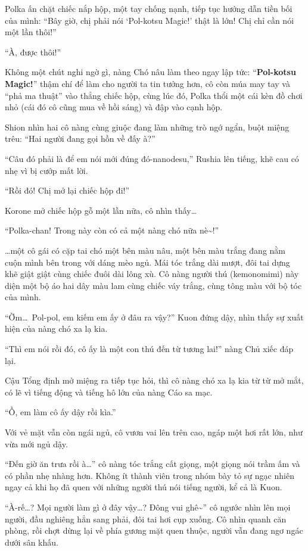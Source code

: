 \documentclass[../main.tex]{subfiles}
\begin{document}
Polka ấn chặt chiếc nắp hộp, một tay chống nạnh, tiếp tục hướng dẫn tiền bối của mình: ``Bây giờ, chị phải nói `Pol-kotsu Magic!' thật là lớn! Chị chỉ cần nói một lần thôi!''

``À, được thôi!''

Không một chút nghi ngờ gì, nàng Chó nâu làm theo ngay lập tức: ``\textbf{Pol-kotsu Magic!}'' thậm chí để làm cho người ta tin tưởng hơn, cô còn múa may tay và ``phả ma thuật'' vào thẳng chiếc hộp, cùng lúc đó, Polka thổi một cái kèn đồ chơi nhỏ (cái đó cô cũng mua về hồi sáng) và đập vào cạnh hộp.

Shion nhìn hai cô nàng cùng giuộc đang làm những trò ngớ ngẩn, buột miệng trêu: ``Hai người đang gọi hồn về đấy à?''

``Câu đó phải là để em nói mới đúng đó-nanodesu,'' Rushia lên tiếng, khẽ cau có nhẹ vì bị cướp mất lời.

``Rồi đó! Chị mở lại chiếc hộp đi!''

Korone mở chiếc hộp gỗ một lần nữa, cô nhìn thấy\dots

``Polka-chan! Trong này còn có cả một nàng chó nữa nè\~{}!''

\dots một cô gái có cặp tai chó một bên màu nâu, một bên màu trắng đang nằm cuộn mình bên trong với dáng mèo ngủ. Mái tóc trắng dài mượt, đôi tai dựng khẽ giật giật cùng chiếc đuôi dài lông xù. Cô nàng người thú (kemonomimi) này diện một bộ áo hai dây màu lam cùng chiếc váy trắng, cùng tông màu với bộ tóc của mình.

``Ờm\dots\ Pol-pol, em kiếm em ấy ở đâu ra vậy?'' Kuon đứng dậy, nhìn thấy sự xuất hiện của nàng chó xa lạ kia.

``Thì em nói rồi đó, cô ấy là một con thú đến từ tương lai!'' nàng Chủ xiếc đáp lại.

Cậu Tổng định mở miệng ra tiếp tục hỏi, thì cô nàng chó xa lạ kia từ từ mở mắt, có lẽ vì tiếng động và tiếng hô lớn của nàng Cáo sa mạc.

``Ồ, em làm cô ấy dậy rồi kìa.''

Với vẻ mặt vẫn còn ngái ngủ, cô vươn vai lên trên cao, ngáp một hơi rất lớn, như vừa mới ngủ dậy.

``Đến giờ ăn trưa rồi à\dots'' cô nàng tóc trắng cất giọng, một giọng nói trầm ấm và có phần nhẹ nhàng hơn. Không ít thành viên trong nhóm bày tỏ sự ngạc nhiên ngay cả khi họ đã quen với những người thú nói tiếng người, kể cả là Kuon.

``À-rế\dots? Mọi người làm gì ở đây vậy\dots? Đông vui ghê\~{}'' cô ngước nhìn lên mọi người, đầu nghiêng hẳn sang phải, đôi tai hơi cụp xuống. Cô nhìn quanh căn phòng, rồi chợt dừng lại về phía gương mặt quen thuộc, người vẫn đang ngơ ngác dưới sân khấu.
\end{document}
